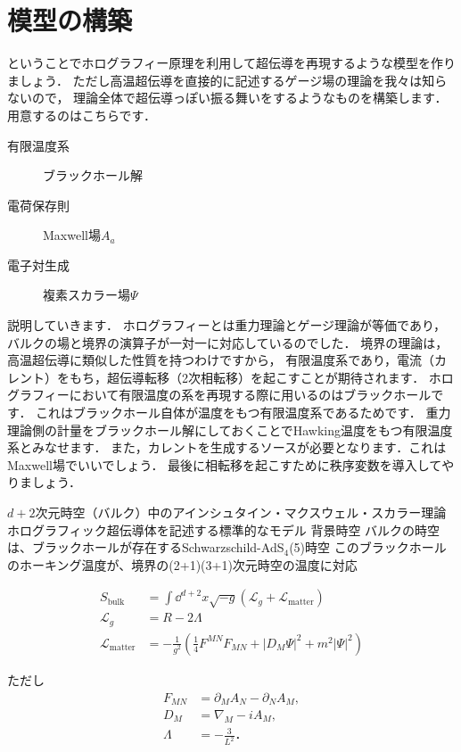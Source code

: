 \documentclass[b5paper,11pt,dvipdfmx]{jsarticle}
\numberwithin{equation}{section}
\theoremstyle{definition}
\begin{document}
\section{模型の構築}
ということでホログラフィー原理を利用して超伝導を再現するような模型を作りましょう．
ただし高温超伝導を直接的に記述するゲージ場の理論を我々は知らないので，
理論全体で超伝導っぽい振る舞いをするようなものを構築します．
用意するのはこちらです．
\begin{description}
    \item[有限温度系] ブラックホール解
    \item[電荷保存則] Maxwell場$A_a$
    \item[電子対生成] 複素スカラー場$\Psi$
\end{description}
説明していきます．
ホログラフィーとは重力理論とゲージ理論が等価であり，バルクの場と境界の演算子が一対一に対応しているのでした．
境界の理論は，高温超伝導に類似した性質を持つわけですから，
有限温度系であり，電流（カレント）をもち，超伝導転移（2次相転移）を起こすことが期待されます．
ホログラフィーにおいて有限温度の系を再現する際に用いるのはブラックホールです．
これはブラックホール自体が温度をもつ有限温度系であるためです．
重力理論側の計量をブラックホール解にしておくことでHawking温度をもつ有限温度系とみなせます．
また，カレントを生成するソースが必要となります．これはMaxwell場でいいでしょう．
最後に相転移を起こすために秩序変数を導入してやりましょう．


$d+2$次元時空（バルク）中のアインシュタイン・マクスウェル・スカラー理論
ホログラフィック超伝導体を記述する標準的なモデル
背景時空
バルクの時空は、ブラックホールが存在するSchwarzschild-AdS$_4$(5)時空
このブラックホールのホーキング温度が、境界の(2+1)(3+1)次元時空の温度に対応

\begin{equation}
    \begin{split}
        S_{\text{bulk}}
        &= \int \dd^{d+2} x \sqrt{-g} \left( \mathcal{L}_g + \mathcal{L}_{\text{matter}} \right)\\
        \mathcal{L}_{g}
        &= R - 2 \Lambda\\
        \mathcal{L}_{\text{matter}}
        &= - \frac{1}{g^2} \left( \frac{1}{4} F^{MN} F_{MN} + |D_M \Psi|^2 + m^2 |\Psi|^2 \right)
    \end{split}
\end{equation}

ただし
\begin{equation}
    \begin{split}
        F_{MN} &= \partial_M A_N - \partial_N A_M,\\
        D_M &= \nabla_M - i A_M,\\
        \Lambda &= - \frac{3}{L^2}．
    \end{split}
\end{equation}
\end{document}
